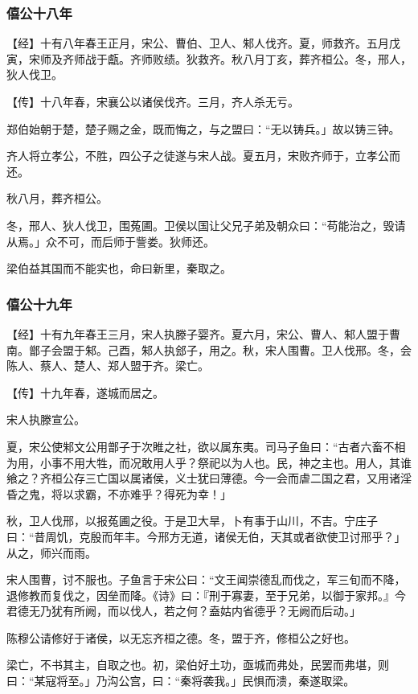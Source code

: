 \documentclass[]{article}
\begin{document}
\hypertarget{header-n838}{%
\subsubsection{僖公十八年}\label{header-n838}}

【经】十有八年春王正月，宋公、曹伯、卫人、邾人伐齐。夏，师救齐。五月戊寅，宋师及齐师战于甗。齐师败绩。狄救齐。秋八月丁亥，葬齐桓公。冬，邢人，狄人伐卫。

【传】十八年春，宋襄公以诸侯伐齐。三月，齐人杀无亏。

郑伯始朝于楚，楚子赐之金，既而悔之，与之盟曰：``无以铸兵。」故以铸三钟。

齐人将立孝公，不胜，四公子之徒遂与宋人战。夏五月，宋败齐师于，立孝公而还。

秋八月，葬齐桓公。

冬，邢人、狄人伐卫，围菟圃。卫侯以国让父兄子弟及朝众曰：``苟能治之，毁请从焉。」众不可，而后师于訾娄。狄师还。

梁伯益其国而不能实也，命曰新里，秦取之。

\hypertarget{header-n848}{%
\subsubsection{僖公十九年}\label{header-n848}}

【经】十有九年春王三月，宋人执滕子婴齐。夏六月，宋公、曹人、邾人盟于曹南。鄫子会盟于邾。己酉，邾人执郐子，用之。秋，宋人围曹。卫人伐邢。冬，会陈人、蔡人、楚人、郑人盟于齐。梁亡。

【传】十九年春，遂城而居之。

宋人执滕宣公。

夏，宋公使邾文公用鄫子于次睢之社，欲以属东夷。司马子鱼曰：``古者六畜不相为用，小事不用大牲，而况敢用人乎？祭祀以为人也。民，神之主也。用人，其谁飨之？齐桓公存三亡国以属诸侯，义士犹曰薄德。今一会而虐二国之君，又用诸淫昏之鬼，将以求霸，不亦难乎？得死为幸！」

秋，卫人伐邢，以报菟圃之役。于是卫大旱，卜有事于山川，不吉。宁庄子曰：``昔周饥，克殷而年丰。今邢方无道，诸侯无伯，天其或者欲使卫讨邢乎？」从之，师兴而雨。

宋人围曹，讨不服也。子鱼言于宋公曰：``文王闻崇德乱而伐之，军三旬而不降，退修教而复伐之，因垒而降。《诗》曰：『刑于寡妻，至于兄弟，以御于家邦。』今君德无乃犹有所阙，而以伐人，若之何？盍姑内省德乎？无阙而后动。」

陈穆公请修好于诸侯，以无忘齐桓之德。冬，盟于齐，修桓公之好也。

梁亡，不书其主，自取之也。初，梁伯好土功，亟城而弗处，民罢而弗堪，则曰：``某寇将至。」乃沟公宫，曰：``秦将袭我。」民惧而溃，秦遂取梁。
\end{document}
